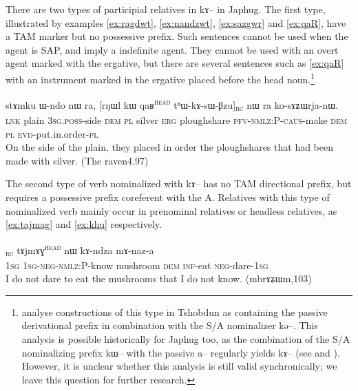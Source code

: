 \documentclass[oldfontcommands,oneside,a4paper,11pt]{article}
\newcommand{\ipa}[1]{{\phon #1}} %
\newcommand{\tete}{\textsuperscript{\textsc{head}}}
\newcommand{\rc}{\textsubscript{\textsc{rc}}}
\begin{document}
There are two types of  participial relatives in \ipa{kɤ}-- in Japhug. The first type, illustrated by examples  \ref{ex:ragdwt}, \ref{ex:nandzwt}, \ref{ex:sazgwr} and \ref{ex:qaR}, have a TAM marker but no possessive prefix. Such sentences cannot be used when the agent is  SAP, and imply a indefinite agent. They cannot be used with an overt agent marked with the ergative, but there are several sentences such as \ref{ex:qaR} with an instrument marked in the ergative placed before the head noun.\footnote{ \citet{jacksonlin07} analyse constructions of this type in Tshobdun as   containing the passive derivational prefix in combination with the S/A nominalizer \ipa{kə}--. This analysis is possible historically for Japhug too, as the combination of the S/A nominalizing prefix \ipa{kɯ}-- with the passive \ipa{a}-- regularly yields \ipa{kɤ}-- (see \citealt{jacques07passif} and \citealt{jacques12demotion}). However, it is unclear whether this analysis is still valid synchronically; we leave this question for further research.}

\begin{exe}
   \ex \label{ex:qaR}
\gll  \ipa{tɕe}  	\ipa{stɤmku}  	\ipa{ɯ-ndo}  	\ipa{nɯ} \ipa{ra,}  	[\ipa{rŋɯl}  	\ipa{kɯ} \ipa{qaʁ}\tete{}  	\ipa{tʰɯ-kɤ-sɯ-βzu}]\rc{} 	\ipa{nɯ} \ipa{ra}  	\ipa{ko-sɤʑɯrja-nɯ.}   \\
\textsc{lnk} plain \textsc{3sg.poss}-side \textsc{dem} \textsc{pl} 
silver \textsc{erg} ploughshare \textsc{pfv-nmlz:P-caus}-make  \textsc{dem} \textsc{pl} \textsc{evd}-put.in.order-\textsc{pl}\\
  \glt On the side of the plain, they placed in order the ploughshares that had been made with silver. (The raven4.97)
   \end{exe}  


The second type of verb nominalized with \ipa{kɤ}-- has no TAM directional prefix, but requires a possessive prefix coreferent with the A. Relatives with this type of nominalized verb mainly occur in prenominal relatives or headless relatives, as \ref{ex:tajmag} and \ref{ex:khu} respectively.

     \begin{exe}
   \ex \label{ex:tajmag}
   \gll
[\ipa{aʑo}  	\ipa{a-mɤ-kɤ-sɯz}]\rc{}  	\ipa{tɤjmɤɣ}\tete{}  	\ipa{nɯ}  	\ipa{kɤ-ndza}  	\ipa{mɤ-naz-a}  \\
\textsc{1sg} \textsc{1sg-neg-nmlz:P}-know mushroom \textsc{dem} \textsc{inf}-eat \textsc{neg}-dare-\textsc{1sg} \\
\glt I do not dare to eat the mushrooms that I do not know. (mbrɤʑɯm,103)
\end{exe}
 
\end{document}
